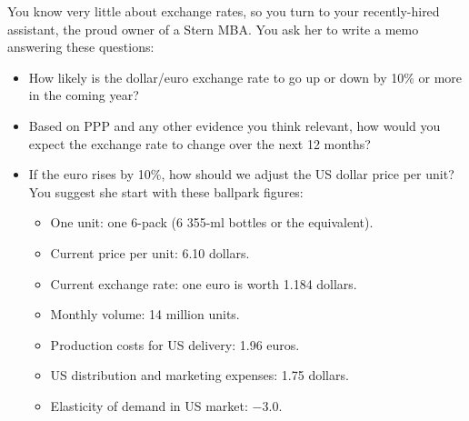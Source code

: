 \documentclass[letterpaper,12pt]{article}
\begin{document}
You know very little about exchange rates, 
so you turn to your recently-hired assistant, 
the proud owner of a Stern MBA.  
You ask her to write a memo answering these questions:  
%
\begin{itemize}%
\item How likely is the dollar/euro exchange rate to go up or down 
by 10\% or more in the coming year?  
%

\begin{comment}
\item Is the euro under- or overvalued on a PPP basis?  
Possible data sources:  
%
\begin{itemize}
\item  The Economist's 
\href{http://www.economist.com/markets/Bigmac/index.cfm}
{Big Mac index}.  

\item The CPI-based real exchange rate between the Euro Zone and the US.  
[The Euro Zone's CPI is called the ``Harmonized Index of Consumer Prices'' (HICP).] 

\end{itemize}
\end{comment}

\item Based on PPP and any other evidence you think relevant, 
how would you expect the exchange rate to change over the next 12 months?  

\item If the euro rises by 10\%, 
how should we adjust the US dollar price per unit?  
You suggest she start with these ballpark figures:  
%
\begin{itemize} 
\item One unit:  one 6-pack (6 355-ml bottles or the equivalent).   
\item Current price per unit:  6.10 dollars.
\item Current exchange rate:  one euro is worth 1.184 dollars.  
\item Monthly volume:  14 million units. 
\item Production costs for US delivery:  1.96 euros.  
\item US distribution and marketing expenses:  1.75 dollars.  
\item Elasticity of demand in US market:  $-3.0$.  
\end{itemize}


\end{itemize}
\end{document}
